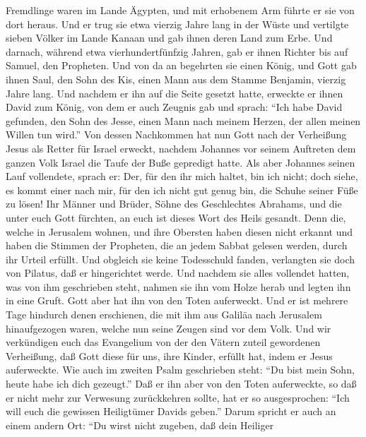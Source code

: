 Fremdlinge waren im Lande Ägypten, und mit erhobenem Arm führte er sie
von dort heraus.  Und er trug sie etwa vierzig Jahre lang
in der Wüste  und vertilgte sieben Völker im Lande Kanaan
und gab ihnen deren Land zum Erbe.  Und darnach, während
etwa vierhundertfünfzig Jahren, gab er ihnen Richter bis auf Samuel, den
Propheten.  Und von da an begehrten sie einen König, und
Gott gab ihnen Saul, den Sohn des Kis, einen Mann aus dem Stamme
Benjamin, vierzig Jahre lang.  Und nachdem er ihn auf die
Seite gesetzt hatte, erweckte er ihnen David zum König, von dem er auch
Zeugnis gab und sprach: ``Ich habe David gefunden, den Sohn des Jesse,
einen Mann nach meinem Herzen, der allen meinen Willen tun wird.''
 Von dessen Nachkommen hat nun Gott nach der Verheißung
Jesus als Retter für Israel erweckt,  nachdem Johannes
vor seinem Auftreten dem ganzen Volk Israel die Taufe der Buße gepredigt
hatte.  Als aber Johannes seinen Lauf vollendete, sprach
er: Der, für den ihr mich haltet, bin ich nicht; doch siehe, es kommt
einer nach mir, für den ich nicht gut genug bin, die Schuhe seiner Füße
zu lösen!  Ihr Männer und Brüder, Söhne des Geschlechtes
Abrahams, und die unter euch Gott fürchten, an euch ist dieses Wort des
Heils gesandt.  Denn die, welche in Jerusalem wohnen, und
ihre Obersten haben diesen nicht erkannt und haben die Stimmen der
Propheten, die an jedem Sabbat gelesen werden, durch ihr Urteil erfüllt.
 Und obgleich sie keine Todesschuld fanden, verlangten
sie doch von Pilatus, daß er hingerichtet werde.  Und
nachdem sie alles vollendet hatten, was von ihm geschrieben steht,
nahmen sie ihn vom Holze herab und legten ihn in eine Gruft.
 Gott aber hat ihn von den Toten auferweckt.
 Und er ist mehrere Tage hindurch denen erschienen, die
mit ihm aus Galiläa nach Jerusalem hinaufgezogen waren, welche nun seine
Zeugen sind vor dem Volk.  Und wir verkündigen euch das
Evangelium von der den Vätern zuteil gewordenen Verheißung, daß Gott
diese für uns, ihre Kinder, erfüllt hat, indem er Jesus auferweckte.
 Wie auch im zweiten Psalm geschrieben steht: ``Du bist
mein Sohn, heute habe ich dich gezeugt.''  Daß er ihn
aber von den Toten auferweckte, so daß er nicht mehr zur Verwesung
zurückkehren sollte, hat er so ausgesprochen: ``Ich will euch die
gewissen Heiligtümer Davids geben.''  Darum spricht er
auch an einem andern Ort: ``Du wirst nicht zugeben, daß dein Heiliger
